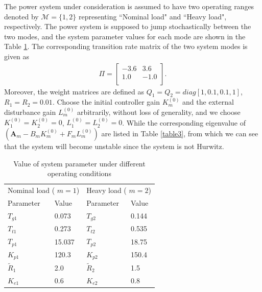\documentclass[journal]{IEEEtran}
\begin{document}
The  power system under consideration is assumed to have two operating ranges denoted by  $\mathcal{M} = \{1,2\}$  representing ``Nominal load" and ``Heavy load", respectively. The power system is supposed to jump stochastically between the two modes, and the system parameter values for each mode are shown in the Table \ref{table2}.
The corresponding transition rate matrix of the two system modes is given as
\begin{align*}
    \Pi=\left[ \begin{matrix}
        -3.6&		3.6\\
       1.0&		-1.0\\
    \end{matrix} \right].
\end{align*}
Moreover, the weight matrices are defined as $Q_{1}=Q_{2}=diag[1,0.1,0.1,1]$, $R_{1}=R_{2}=0.01$. Choose the initial controller gain $K^{(0)}_m$ and the external disturbance gain $L^{(0)}_m$ arbitrarily, without loss of generality, and we choose $K^{(0)}_{1}=K^{(0)}_{2}=0$, $L^{(0)}_{1}=L^{(0)}_{2}=0$. While the corresponding eigenvalue of $(\mathbf{A}_{m}-B_{m }K^{(0)}_{m}+F_{m }L^{(0)}_{m})$ are listed in Table \ref{table3}, from which we can see that the system will become unstable since the system is not Hurwitz.
\begin{table}[htbp]
	\centering
	\fontsize{8}{10}\selectfont
	\caption{Value of system parameter under different operating conditions}\label{table2}
	\begin{tabular}{l|l|l|l}
	\hline
	\multicolumn{2}{c}{ Nominal load ( $m=1$)}  &  \multicolumn{2}{|c}{ Heavy load ( $m=2$)}  \\
	\cline{1-2}
	\cline{3-4}
	Parameter & Value & Parameter & Value  \\
	\hline
	$T_{g1}$  &   0.073     &    $T_{g2}$     &    0.144    \\
	$T_{t1}$  &  0.273      &    $T_{t2}$     &    0.535    \\
	$T_{p1}$  &   15.037    &    $T_{p2}$     &    18.75   \\
	$K_{p1}$  &   120.3     &    $K_{p2}$     &   150.4     \\
	$\tilde{R}_1$      &   2.0       &    $\tilde{R}_2$         &    1.5      \\
	$K_{e1}$  &   0.6       &    $K_{e2}$     &   0.8       \\
	\hline
	\end{tabular}
	\end{table}	
\end{document}
